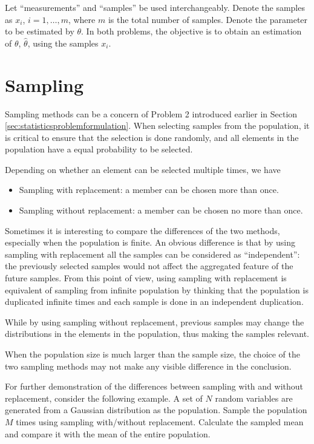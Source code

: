Let ``measurements'' and ``samples'' be used interchangeably. Denote the samples as $x_i$, $i=1,\ldots,m$, where $m$ is the total number of samples. Denote the parameter to be estimated by $\theta$. In both problems, the objective is to obtain an estimation of $\theta$, $\hat{\theta}$, using the samples $x_i$. 

\section{Sampling}

Sampling methods can be a concern of Problem 2 introduced earlier in Section \ref{sec:statisticsproblemformulation}. 
When selecting samples from the population, it is critical to ensure that the selection is done randomly, and all elements in the population have a equal probability to be selected. 

Depending on whether an element can be selected multiple times, we have
\begin{itemize}
  \item Sampling with replacement: a member can be chosen more than once.
  \item Sampling without replacement: a member can be chosen no more than once.
\end{itemize}
Sometimes it is interesting to compare the differences of the two methods, especially when the population is finite. An obvious difference is that by using sampling with replacement all the samples can be considered as ``independent'': the previously selected samples would not affect the aggregated feature of the future samples. From this point of view, using sampling with replacement is equivalent of sampling from infinite population by thinking that the population is duplicated infinite times and each sample is done in an independent duplication.

While by using sampling without replacement, previous samples may change the distributions in the elements in the population, thus making the samples relevant. 

When the population size is much larger than the sample size, the choice of the two sampling methods may not make any visible difference in the conclusion.

For further demonstration of the differences between sampling with and without replacement, consider the following example. A set of $N$ random variables are generated from a Gaussian distribution as the population. Sample the population $M$ times using sampling with/without replacement. Calculate the sampled mean and compare it with the mean of the entire population.


